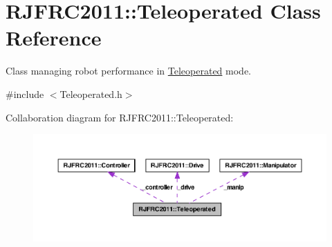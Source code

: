 \hypertarget{class_r_j_f_r_c2011_1_1_teleoperated}{
\section{RJFRC2011::Teleoperated Class Reference}
\label{class_r_j_f_r_c2011_1_1_teleoperated}
}


Class managing robot performance in \hyperlink{class_r_j_f_r_c2011_1_1_teleoperated}{Teleoperated} mode.  




{\ttfamily \#include $<$Teleoperated.h$>$}



Collaboration diagram for RJFRC2011::Teleoperated:\nopagebreak
\begin{figure}[H]
\begin{center}
\leavevmode
\includegraphics[width=400pt]{class_r_j_f_r_c2011_1_1_teleoperated__coll__graph}
\end{center}
\end{figure}
